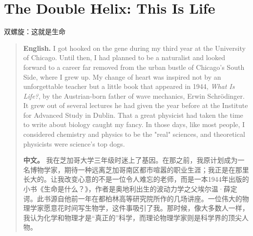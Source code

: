\chapter{The Double Helix: This Is Life}
\begin{center}
\large 双螺旋：这就是生命
\end{center}

\begin{quote}
\noindent\textbf{English.} I got hooked on the gene during my third year at the University of Chicago. Until then, I had planned to be a naturalist and looked forward to a career far removed from the urban bustle of Chicago's South Side, where I grew up. My change of heart was inspired not by an unforgettable teacher but a little book that appeared in 1944, \emph{What Is Life?}, by the Austrian-born father of wave mechanics, Erwin Schrödinger. It grew out of several lectures he had given the year before at the Institute for Advanced Study in Dublin. That a great physicist had taken the time to write about biology caught my fancy. In those days, like most people, I considered chemistry and physics to be the "real" sciences, and theoretical physicists were science's top dogs.

\smallskip
\noindent\textbf{中文。} 我在芝加哥大学三年级时迷上了基因。在那之前，我原计划成为一名博物学家，期待一种远离芝加哥南区都市喧嚣的职业生涯；我正是在那里长大的。让我改变心意的不是一位令人难忘的老师，而是一本1944年出版的小书《生命是什么？》，作者是奥地利出生的波动力学之父埃尔温·薛定谔。此书源自他前一年在都柏林高等研究院所作的几场讲座。一位伟大的物理学家愿意花时间写生物学，这件事吸引了我。那时候，像大多数人一样，我认为化学和物理才是“真正的”科学，而理论物理学家则是科学界的顶尖人物。
\end{quote}

